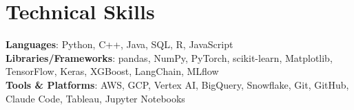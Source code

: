 \documentclass[letterpaper,11pt]{article}
\begin{document}
\section{Technical Skills}
 \begin{itemize}[leftmargin=0in, label={}]
    \small{\item{
     \textbf{Languages}{: Python, C++, Java, SQL, R, JavaScript} \\
     \textbf{Libraries/Frameworks}{: pandas, NumPy, PyTorch, scikit-learn, Matplotlib, TensorFlow, Keras, XGBoost, LangChain, MLflow} \\
     \textbf{Tools \& Platforms}{: AWS, GCP, Vertex AI, BigQuery, Snowflake, Git, GitHub, Claude Code, Tableau, Jupyter Notebooks}
    }}
 \end{itemize}
\end{document}
